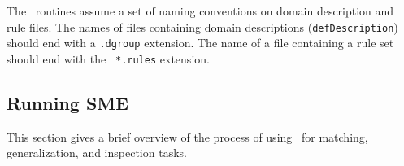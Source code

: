 The \SME\ routines assume a set of naming conventions on domain description
and rule files. The names of files containing
domain descriptions ({\tt defDescription}) should end with a {\tt *.dgroup}
extension. The name of a file containing a rule set should end with the {\tt
*.rules} extension.


\subsection{Running SME}

\indent
{}

This section gives a brief overview of the process of using \SME\ for
matching, generalization, and inspection tasks.



